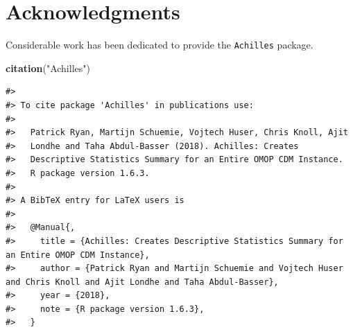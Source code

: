 \documentclass[]{article}
\newenvironment{Shaded}{\begin{snugshade}}{\end{snugshade}}
\newcommand{\KeywordTok}[1]{\textcolor[rgb]{0.13,0.29,0.53}{\textbf{#1}}}
\newcommand{\StringTok}[1]{\textcolor[rgb]{0.31,0.60,0.02}{#1}}
\newcommand{\NormalTok}[1]{#1}
\begin{document}
\section{Acknowledgments}\label{acknowledgments}

Considerable work has been dedicated to provide the \texttt{Achilles}
package.

\begin{Shaded}
\begin{Highlighting}[]
\KeywordTok{citation}\NormalTok{(}\StringTok{"Achilles"}\NormalTok{)}
\end{Highlighting}
\end{Shaded}

\begin{verbatim}
#> 
#> To cite package 'Achilles' in publications use:
#> 
#>   Patrick Ryan, Martijn Schuemie, Vojtech Huser, Chris Knoll, Ajit
#>   Londhe and Taha Abdul-Basser (2018). Achilles: Creates
#>   Descriptive Statistics Summary for an Entire OMOP CDM Instance.
#>   R package version 1.6.3.
#> 
#> A BibTeX entry for LaTeX users is
#> 
#>   @Manual{,
#>     title = {Achilles: Creates Descriptive Statistics Summary for an Entire OMOP CDM Instance},
#>     author = {Patrick Ryan and Martijn Schuemie and Vojtech Huser and Chris Knoll and Ajit Londhe and Taha Abdul-Basser},
#>     year = {2018},
#>     note = {R package version 1.6.3},
#>   }
\end{verbatim}
\end{document}
